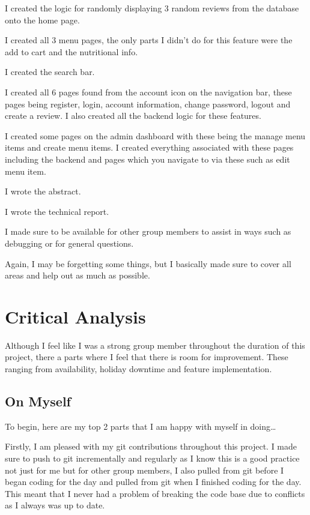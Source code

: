 \documentclass[twoside,12pt,titlepage,a4paper]{article}
\begin{document}
I created  the logic for randomly displaying 3 random reviews from the database onto the home page.

I created all 3 menu pages, the only parts I didn’t do for this feature were the add to cart and the 
nutritional info.

I created the search bar.

I created all 6 pages found from the account icon on the navigation bar, these pages being register, login, 
account information, change password, logout and create a review. I also created all the backend logic for 
these features.

I created some pages on the admin dashboard with these being the manage menu items and create menu items. I 
created everything associated with these pages including the backend and pages which you navigate to via these
such as edit menu item.

I wrote the abstract.

I wrote the technical report.

I made sure to be available for other group members to assist in ways such as debugging or for general 
questions.

Again, I may be forgetting some things, but I basically made sure to cover all areas and help out as much as 
possible.

\section{Critical Analysis}
\label{Critical Analysis}
Although I feel like I was a strong group member throughout the duration of this project, there a parts where I
feel that there is room for improvement. These ranging from availability, holiday downtime and feature 
implementation.

\vspace*{-0.05in}
\subsection{On Myself}
\vspace*{-0.05in}
To begin, here are my top 2 parts that I am happy with myself in doing…

Firstly, I am pleased with my git contributions throughout this project. I made sure to push to git 
incrementally and regularly as I know this is a good practice not just for me but for other group members, I 
also pulled from git before I began coding for the day and pulled from git when I finished coding for the day.
This meant that I never had a problem of breaking the code base due to conflicts as I always was up to date.
\end{document}
